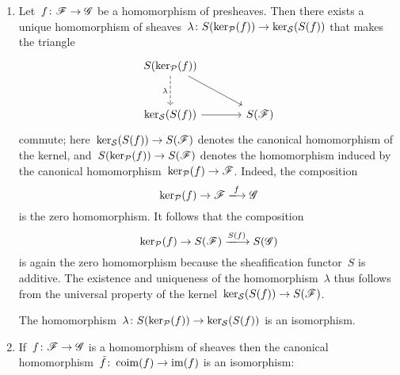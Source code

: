 \begin{example}
  \begin{enumerate}[resume]
    \item
      Let~$f \colon \mathscr{F} \to \mathscr{G}$ be a homomorphism of presheaves.
      Then there exists a unique homomorphism of sheaves~$\lambda \colon S( \ker_{\mathcal{P}}(f) ) \to \ker_{\mathcal{S}}(S(f))$ that makes the triangle
      \[
        \begin{tikzcd}[sep = large]
            S( \ker_\Pcat(f) )
            \arrow[dashed]{d}[left]{\lambda}
            \arrow{dr}
          & {}
          \\
            \ker_\Scat(S(f))
            \arrow{r}
          & S(\Fs)
        \end{tikzcd}
      \]
      commute;
      here~$\ker_{\mathcal{S}}(S(f)) \to S(\mathscr{F})$ denotes the canonical homomorphism of the kernel, and~$S(\ker_{\mathcal{P}}(f)) \to S(\mathscr{F})$ denotes the homomorphism induced by the canonical homomorphism~$\ker_{\mathcal{P}}(f) \to \mathscr{F}$.
      Indeed, the composition
      \[
          \ker_\Pcat(f)
        \to
          \Fs
        \xlongto{f}
          \Gs
      \]
      is the zero homomorphism.
      It follows that the composition
      \[
          \ker_\Pcat(f)
        \to
          S(\Fs)
        \xlongto{S(f)}
          S(\Gs)
      \]
      is again the zero homomorphism because the sheafification functor~$S$ is additive.
      The existence and uniqueness of the homomorphism~$\lambda$ thus follows from the universal property of the kernel~$\ker_{\mathcal{S}}(S(f)) \to S(\mathscr{F})$.
      
      \begin{fact}
        The homomorphism~$\lambda \colon S( \ker_{\mathcal{P}}(f) ) \to \ker_{\mathcal{S}}(S(f))$ is an isomorphism.
      \end{fact}
      
    \item
      If~$f \colon \mathscr{F} \to \mathscr{G}$ is a homomorphism of sheaves then the canonical homomorphism~$\tilde{f} \colon \operatorname{coim}(f) \to \operatorname{im}(f)$ is an isomorphism:
      

\end{enumerate}
\end{example}
